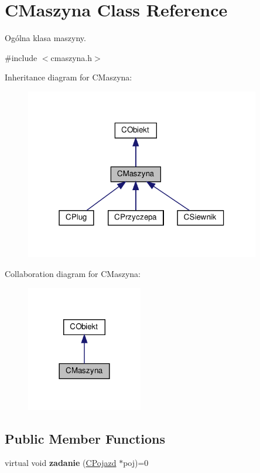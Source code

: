 \hypertarget{class_c_maszyna}{}\section{C\+Maszyna Class Reference}
\label{class_c_maszyna}


Ogólna klasa maszyny.  




{\ttfamily \#include $<$cmaszyna.\+h$>$}



Inheritance diagram for C\+Maszyna\+:\nopagebreak
\begin{figure}[H]
\begin{center}
\leavevmode
\includegraphics[width=291pt]{class_c_maszyna__inherit__graph}
\end{center}
\end{figure}


Collaboration diagram for C\+Maszyna\+:\nopagebreak
\begin{figure}[H]
\begin{center}
\leavevmode
\includegraphics[width=144pt]{class_c_maszyna__coll__graph}
\end{center}
\end{figure}
\subsection*{Public Member Functions}
\begin{DoxyCompactItemize}
\item 
\mbox{\label{class_c_maszyna_a139adaf1bb1848d4171b2e457fcb2a51}} 
virtual void {\bfseries zadanie} (\mbox{\hyperlink{class_c_pojazd}{C\+Pojazd}} $\ast$poj)=0
\end{DoxyCompactItemize}
